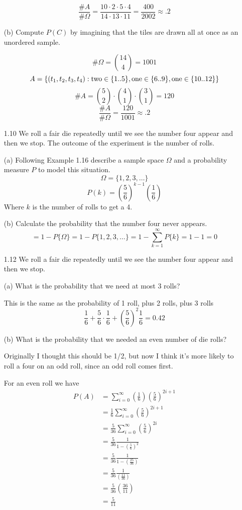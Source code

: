 \documentclass[10pt]{article}
\begin{document}
\begin{itemize}
\[ \frac{\#A}{\#\Omega}  = \frac{10 \cdot 2 \cdot 5 \cdot 4}{14 \cdot 13 \cdot 11} 
                = \frac{400}{2002} \approx .2 \]

(b) Compute $P(C)$ by imagining that the tiles are drawn all at once as an
unordered sample.

  \[ \#\Omega = \binom{14}{4} = 1001 \]
  \[ A = \{ (t_1, t_2, t_3, t_4): \text{two} \in \{1..5\}, \\
      \text{one} \in \{6..9\}, \\
      \text{one} \in \{10..12\}
        \} \]
    \[ \#A = \binom{5}{2} \cdot \binom{4}{1} \cdot \binom{3}{1} = 120 \]
\[ \frac{\#A}{\#\Omega}  = \frac{120}{1001} \approx .2 \]

\newpage
\item[1.10] We roll a fair die repeatedly until we see the number four appear and then we stop. The outcome of the experiment is the number of rolls.

(a) Following Example 1.16 describe a sample space $\Omega$ and a
probability measure $P$ to model this situation.
\[ \Omega = \{1,2,3, \ldots \} \]
\[ P(k) = \left( \frac{5}{6} \right)^{k-1} \left( \frac{1}{6} \right) \]
Where $k$ is the number of rolls to get a 4.

(b) Calculate the probability that the number four never appears.
\[ = 1 - P\{\Omega\} = 1 - P\{1,2,3, \ldots\} = 1 - \sum^{\infty}_{k=1} P\{k\} = 1 - 1 = 0  \]

\newpage
\item[1.12] We roll a fair die repeatedly until we see the number four appear and then we stop.

(a) What is the probability that we need at most 3 rolls?

This is the same as the probability of 1 roll, plus 2 rolls, plus 3 rolls
\[ \frac{1}{6} + \frac{5}{6} \cdot \frac{1}{6}
  + \left( \frac{5}{6} \right)^2 \frac{1}{6}  = 0.42 \]

(b) What is the probability that we needed an even number of die rolls?

Originally I thought this should be 1/2, but now I think it's more
likely to roll a four on an odd roll, since an odd roll comes first.

For an even roll we have 
\begin{align*}
  P(A) & =\sum^{\infty}_{i=0} \left( \frac{1}{6} \right) 
                \left( \frac{5}{6} \right)^{2i+1} \\
      & = \frac{1}{6} \sum^{\infty}_{i=0} \left( \frac{5}{6} \right)^{2i+1} \\
      & = \frac{5}{36} \sum^{\infty}_{i=0} \left( \frac{5}{6} \right)^{2i} \\
       & =\frac{5}{36} \frac{1}{1 - \left( \frac{5}{6} \right)^2} \\
       & =\frac{5}{36} \frac{1}{1 - \left( \frac{25}{36} \right)} \\
       & =\frac{5}{36} \frac{1}{\left( \frac{11}{36} \right)} \\
       & =\frac{5}{36} \left( \frac{36}{11} \right) \\
       & =\frac{5}{11}
\end{align*}


\end{itemize}
\end{document}
